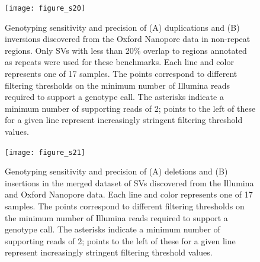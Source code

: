 \documentclass[12pt]{article}
\newenvironment{cfigure}
	{\begin{figure} \centering}
	{\end{figure}}
\newenvironment{lsfigure}
	{\begin{landscape} \begin{figure} \centering}
	{\end{figure} \end{landscape}}
\begin{document}
\begin{cfigure}
	\texttt{[image: figure\_s20]}

	\caption[Sensitivity and precision of Oxford Nanopore duplication and inversion genotyping in non-repeat regions]{
		Genotyping sensitivity and precision of (A) duplications and (B) inversions discovered from the Oxford Nanopore data in non-repeat regions.
		Only SVs with less than 20\% overlap to regions annotated as repeats were used for these benchmarks. 
		Each line and color represents one of 17 samples. 
		The points correspond to different filtering thresholds on the minimum number of Illumina reads required to support a genotype call.
		The asterisks indicate a minimum number of supporting reads of 2; points to the left of these for a given line represent increasingly stringent filtering threshold values.
	}

	\label{fig_s20}

\end{cfigure}

\clearpage%

\begin{lsfigure}
	\texttt{[image: figure\_s21]}

	\caption[Sensitivity and precision of joint Illumina/Oxford Nanopore deletion and insertion genotyping]{
		Genotyping sensitivity and precision of (A) deletions and (B) insertions in the merged dataset of SVs discovered from the Illumina and Oxford Nanopore data.
			Each line and color represents one of 17 samples. 
			The points correspond to different filtering thresholds on the minimum number of Illumina reads required to support a genotype call.
			The asterisks indicate a minimum number of supporting reads of 2; points to the left of these for a given line represent increasingly stringent filtering threshold values.
	}

	\label{fig_s21}
\end{lsfigure}

\clearpage%
\end{document}
